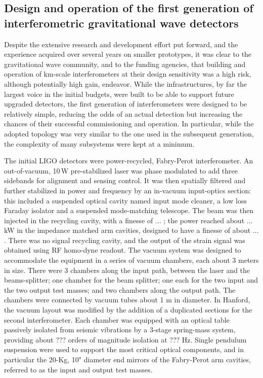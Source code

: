 \subsection{Design and operation of the first generation of interferometric gravitational wave detectors}\label{subsec:1stgen}

Despite the extensive research and development effort put forward, and the experience acquired over several years on smaller prototypes, it was clear to the gravitational wave community, and to the funding agencies, that building and operation of km-scale interferometers at their design sensitivity was a high risk, although potentially high gain, endeavor. While the infrastructures, by far the largest voice in the initial budgets, were built to be able to support future upgraded detectors, the first generation of interferometers were designed to be relatively simple, reducing the odds of an actual detection but increasing the chances of their successful commissioning and operation. In particular, while the adopted topology was very similar to the one used in the subsequent generation, the complexity of many subsystems were kept at a minimum.

The initial LIGO detectors were power-recycled, Fabry-Perot interferometer. An out-of-vacuum, 10\,W pre-stabilized laser was phase modulated to add three sidebands for alignment and sensing control. It was then spatially filtered and further stabilized in power and frequency by an in-vacuum input-optics section: this included a suspended optical cavity named input mode cleaner, a low loss Faraday isolator and a suspended mode-matching telescope. The beam was then injected in the recycling cavity, with a finesse of ... ; the power reached about ... kW in the impedance matched arm cavities, designed to have a finesse of about ... . There was no signal recycling cavity, and the output of the strain signal was obtained using RF homo-dyne readout.
The vacuum system was designed to accommodate the equipment in a series of vacuum chambers, each about 3 meters in size. There were 3 chambers along the input path, between the laser and the beams-splitter; one chamber for the beam splitter; one each for the two input and the two output test masses; and two chambers along the output path. The chambers were connected by vacuum tubes about 1 m in diameter. In Hanford, the vacuum layout was modified by the addition of a duplicated sections for the second interferometer.
Each chamber was equipped with an optical table passively isolated from seismic vibrations by a 3-stage spring-mass system, providing about ??? orders of magnitude isolation at ??? Hz. Single pendulum suspension were used to support the most critical optical components, and in particular the 20-Kg, 10" diameter end mirrors of the Fabry-Perot arm cavities, referred to as the input and output test masses.

